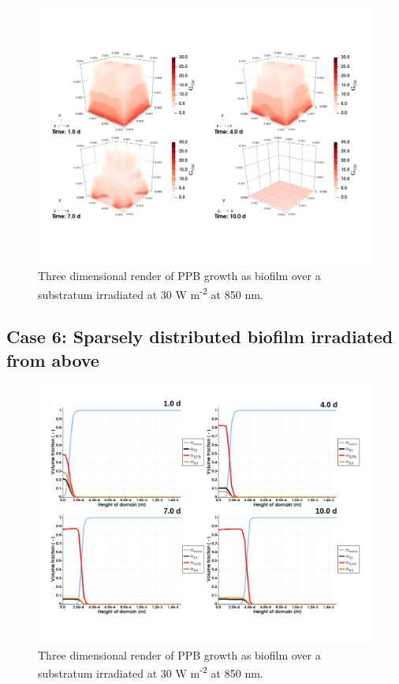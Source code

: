\begin{figure}[tp]
    \centering
    \includegraphics[width=\textwidth,height=0.5\textheight]{Chap4/results/post_processing/renders/case5_3D/case5_3D_rad.pdf}
    \caption{Three dimensional render of PPB growth as biofilm over a substratum irradiated at 30 W m\textsuperscript{-2} at 850 nm. } 
    \label{fig:case5_3D_rad}
\end{figure}



\subsection{Case 6: Sparsely distributed biofilm irradiated from above}

\begin{figure}[tp]
    \centering
    \includegraphics[width=\textwidth,height=0.4\textheight]{Chap4/results/post_processing/renders/case6_3D/case6_3D_dist.pdf}
    \caption{Three dimensional render of PPB growth as biofilm over a substratum irradiated at 30 W m\textsuperscript{-2} at 850 nm. } 
    \label{fig:case6_3D_dist}
\end{figure}

